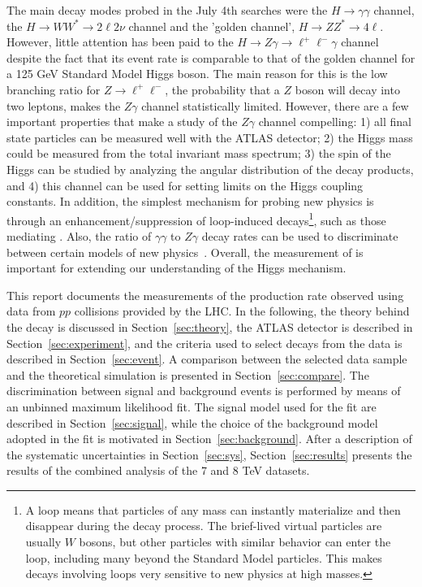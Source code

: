The main decay modes probed in the July 4th searches were
the $H \to \gamma\gamma$ channel, the $H \to WW^* \to 2\ell2\nu$ channel 
and the 'golden channel', $H \to ZZ^* \to 4\ell$. 
However, little attention has been paid to the 
$H \to Z\gamma \to \ell^+\ell^-\gamma$ channel
despite the fact that its event rate is comparable to that of the golden  
channel for a 125 GeV Standard Model Higgs boson. The main reason for this is 
the low branching ratio for $Z \to \ell^+\ell^-$, the
probability that a $Z$ boson will decay into two leptons, 
makes the $Z\gamma$ channel statistically limited. 
However, there are a few important properties that make a study of the 
$Z\gamma$ channel compelling: 
1) all final state particles can be measured well with the ATLAS detector;  
2) the Higgs mass could be measured from the total invariant mass spectrum; 
3) the spin of the Higgs can be studied by analyzing the angular distribution 
of the decay products, and 
4) this channel can be used for setting limits on the Higgs coupling constants.
In addition, the simplest mechanism for probing new physics is through 
an enhancement/suppression of loop-induced decays\footnote{
A loop means that particles of any mass can instantly materialize and 
then disappear during the decay process. The brief-lived virtual particles
are usually $W$ bosons, but other particles with similar behavior can enter
the loop, including many beyond the Standard Model particles. This makes decays 
involving loops very sensitive to new physics at high masses.},
such as those mediating \HToZg. Also,
the ratio of $\gamma\gamma$ to $Z\gamma$ decay rates can
be used to discriminate between certain models of 
new physics~\cite{Zg_newPhy_1,Zg_newPhy_2, Zg_newPhy_3}.
Overall, the measurement of \HToZg is important for extending our understanding
of the Higgs mechanism.

This report documents the measurements of the \HToZg production rate observed
using data from $pp$ collisions provided by the LHC. In the following, the
theory behind the \HToZg decay is discussed in Section~\ref{sec:theory},
the ATLAS detector is described in Section~\ref{sec:experiment}, and the
criteria used to select \HToZg decays from the data is described in 
Section~\ref{sec:event}. A comparison between the selected data sample and
the theoretical simulation is presented in 
Section~\ref{sec:compare}. The discrimination between signal and background 
events is performed by means of an unbinned maximum likelihood fit.
The signal model used for the fit are described
in Section~\ref{sec:signal}, while the choice of the background model adopted
in the fit is motivated in Section~\ref{sec:background}. After a description of
the systematic uncertainties in Section~\ref{sec:sys}, Section~\ref{sec:results}
presents the results of the combined analysis of the 7 and 8 TeV datasets.
